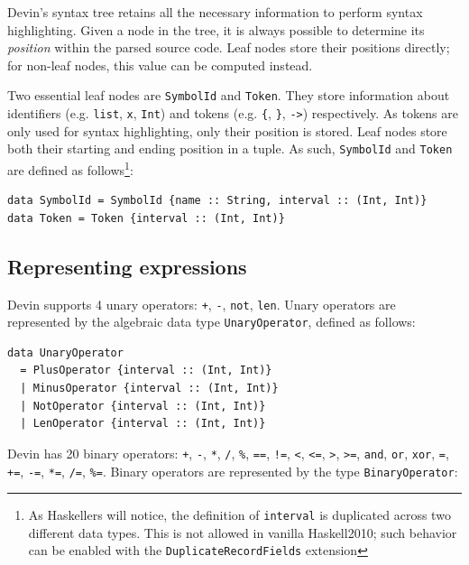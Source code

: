 \documentclass[11pt, american, draft]{PhdThesis}
\begin{document}
  Devin's syntax tree retains all the necessary information to perform syntax highlighting. Given a
  node in the tree, it is always possible to determine its \emph{position} within the parsed source
  code. Leaf nodes store their positions directly; for non-leaf nodes, this value can be computed
  instead.

  Two essential leaf nodes are \verb$SymbolId$ and \verb$Token$. They store information about
  identifiers (e.g. \verb$list$, \verb$x$, \verb$Int$) and tokens (e.g. \verb${$, \verb$}$, \verb$->$)
  respectively. As tokens are only used for syntax highlighting, only their position is stored.
  Leaf nodes store both their starting and ending position in a tuple. As such, \verb$SymbolId$ and
  \verb$Token$ are defined as follows\footnote{As Haskellers will notice, the definition of
  \mbox{\texttt{interval}} is duplicated across two different data types. This is not allowed in
  vanilla Haskell2010; such behavior can be enabled with the \mbox{\texttt{DuplicateRecordFields}}
  extension}:

\begin{verbatim}
data SymbolId = SymbolId {name :: String, interval :: (Int, Int)}
data Token = Token {interval :: (Int, Int)}
\end{verbatim}

  \subsection{Representing expressions}

  Devin supports 4 unary operators: \verb$+$, \verb$-$, \verb$not$, \verb$len$. Unary operators are
  represented by the algebraic data type \verb$UnaryOperator$, defined as follows:

\begin{verbatim}
data UnaryOperator
  = PlusOperator {interval :: (Int, Int)}
  | MinusOperator {interval :: (Int, Int)}
  | NotOperator {interval :: (Int, Int)}
  | LenOperator {interval :: (Int, Int)}
\end{verbatim}

  Devin has 20 binary operators: \verb$+$, \verb$-$, \verb$*$, \verb$/$, \verb$%$, \verb$==$,
  \verb$!=$, \verb$<$, \verb$<=$, \verb$>$, \verb$>=$, \verb$and$, \verb$or$, \verb$xor$, \verb$=$,
  \verb$+=$, \verb$-=$, \verb$*=$, \verb$/=$, \verb$%=$. Binary operators are represented by the
  type \verb$BinaryOperator$:
\end{document}
